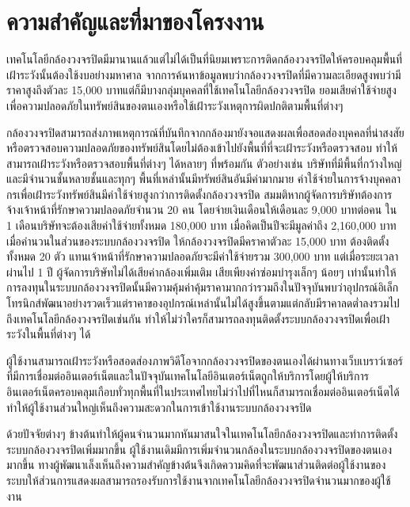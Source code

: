 \section{ความสำคัญและที่มาของโครงงาน}	
		เทคโนโลยีกล้องวงจรปิดมีมานานแล้วแต่ไม่ได้เป็นที่นิยมเพราะการติดกล้องวงจรปิดให้ครอบคลุมพื้นที่เฝ้าระวังนั้นต้องใช้งบอย่างมหาศาล จากการค้นหาข้อมูลพบว่ากล้องวงจรปิดที่มีความละเอียดสูงพบว่ามีราคาสูงถึงตัวละ 15,000 บาทแต่ก็มีบางกลุ่มบุคคลที่ใช้เทคโนโลยีกล้องวงจรปิด ยอมเสียค่าใช้จ่ายสูงเพื่อความปลอดภัยในทรัพย์สินของตนเองหรือใช้เฝ้าระวังเหตุการผิดปกติตามพื้นที่ต่างๆ

	กล้องวงจรปิดสามารถส่งภาพเหตุการณ์ที่บันทึกจากกล้องมายังจอแสดงผลเพื่อสอดส่องบุคคลที่น่าสงสัยหรือตรวจสอบความปลอดภัยของทรัพย์สินโดยไม่ต้องเข้าไปยังพื้นที่ที่จะเฝ้าระวังหรือตรวจสอบ ทำให้สามารถเฝ้าระวังหรือตรวจสอบพื้นที่ต่างๆ ได้หลายๆ ที่พร้อมกัน ตัวอย่างเช่น บริษัทที่มีพื้นที่กว้างใหญ่และมีจำนวนชั้นหลายชั้นและทุกๆ พื้นที่เหล่านั้นมีทรัพย์สินอันมีค่ามากมาย ค่าใช้จ่ายในการจ้างบุคคลากรเพื่อเฝ้าระวังทรัพย์สินมีค่าใช้จ่ายสูงกว่าการติดตั้งกล้องวงจรปิด สมมติหากผู้จัดการบริษัทต้องการจ้างเจ้าหน้าที่รักษาความปลอดภัยจำนวน 20 คน โดยจ่ายเงินเดือนให้เดือนละ 9,000 บาทต่อคน ใน 1 เดือนบริษัทจะต้องเสียค่าใช้จ่ายทั้งหมด 180,000 บาท เมื่อคิดเป็นปีจะมีมูลค่าถึง 2,160,000 บาทเมื่อคำนวนในส่วนของระบบกล้องวงจรปิด ให้กล้องวงจรปิดมีคราคาตัวละ 15,000 บาท ต้องติดตั้งทั้งหมด 20 ตัว แทนเจ้าหน้าที่รักษาความปลอดภัยจะมีค่าใช้จ่ายรวม 300,000 บาท แต่เมื่อระยะเวลาผ่านไป 1 ปี ผู้จัดการบริษัทไม่ได้เสียค่ากล้องเพิ่มเติม เสียเพียงค่าซ่อมบำรุงเล็กๆ น้อยๆ เท่านั้นทำให้การลงทุนในระบบกล้องวงจรปิดนั้นมีความคุ้มค่าคุ้มราคามากกว่ารวมถึงในปัจจุบันพบว่าอุปกรณ์อิเล็กโทรนิกส์พัฒนาอย่างรวดเร็วแต่ราคาของอุปกรณ์เหล่านั้นไม่ได้สูงขึ้นตามแต่กลับมีราคาลดต่ำลงรวมไปถึงเทคโนโลยีกล้องวงจรปิดเช่นกัน ทำให้ไม่ว่าใครก็สามารถลงทุนติดตั้งระบบกล้องวงจรปิดเพื่อเฝ้าระวังในพื้นที่ต่างๆ ได้

		ผู้ใช้งานสามารถเฝ้าระวังหรือสอดส่องภาพวิดีโอจากกล้องวงจรปิดของตนเองได้ผ่านทางเว็บเบราว์เซอร์ที่มีการเชื่อมต่ออินเตอร์เน็ตและในปัจจุบันเทคโนโลยีอินเตอร์เน็ตถูกให้บริการโดยผู้ให้บริการอินเตอร์เน็ตครอบคลุมเกือบทั่วทุกพื้นที่ในประเทศไทยไม่ว่าไปที่ไหนก็สามารถเชื่อมต่ออินเตอร์เน็ตได้
ทำให้ผู้ใช้งานส่วนใหญ่เห็นถึงความสะดวกในการเข้าใช้งานระบบกล้องวงจรปิด


		ด้วยปัจจัยต่างๆ ข้างต้นทำให้ผู้คนจำนวนมากหันมาสนใจในเทคโนโลยีกล้องวงจรปิดและทำการติดตั้งระบบกล้องวงจรปิดเพิ่มมากขึ้น ผู้ใช้งานเดิมมีการเพิ่มจำนวนกล้องในระบบกล้องวงจรปิดของตนเองมากขึ้น ทางผู้พัฒนาเล็งเห็นถึงความสำคัญข้างต้นจึงเกิดความคิดที่จะพัฒนาส่วนติดต่อผู้ใช้งานของระบบให้ส่วนการแสดงผลสามารถรองรับการใช้งานจากเทคโนโลยีกล้องวงจรปิดจำนวนมากของผู้ใช้งาน